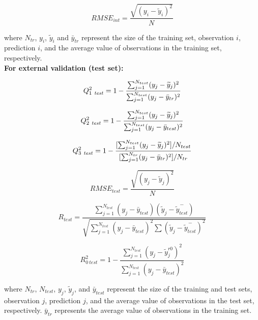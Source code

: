 \documentclass{bmcart}
\begin{document}
\begin{equation}
RMSE_{int} = \frac {\sqrt {(y_i - \widetilde{y}_i)^{2}}} {N}
\end{equation}

where $N_{tr}$, $y_i$, $\widetilde{y}_i$ and $\bar{y}_{tr}$ represent the size of the training set, observation $i$, prediction $i$, and the average value of observations in the training set, respectively. \\

{\bf For external validation (test set):}

\begin{equation}
Q_{1\ {\it test}}^{2} = 1 - \frac {\sum_{j=1}^{N_{test}} (y_j-\widetilde{y}_j)^{2}}  {\sum_{j=1}^{N_{test}} (y_j - \bar{y}_{tr})^{2}}
\end{equation}

\begin{equation}
Q_{2\ {\it test}}^{2} = 1 - \frac {\sum_{j=1}^{N_{test}} (y_j-\widetilde{y}_j)^{2}}  {\sum_{j=1}^{N_{test}} (y_j - \bar{y}_{test})^{2}}
\end{equation}

\begin{equation}
Q_{3\ {\it test}}^{2} = 1 - \frac {[\sum_{j=1}^{N_{test}} (y_j-\widetilde{y}_j)^{2}] / N_{test} }  {[ \sum_{j=1}^{N_{tr}} (y_j - \bar{y}_{tr})^{2}] / N_{tr}}
\end{equation}

\begin{equation}
RMSE_{test} = \frac {\sqrt {(y_j - \widetilde{y}_j)^{2}}} {N} 
\end{equation}

\begin{equation}
R_{test} = \frac {{\sum_{j=1}^{N_{test}} (y_{j} - \bar{y}_{test})}  (\widetilde{y}_{j} - \overset{-}{\widetilde{y}_{test}})} 
{\sqrt{\sum_{j=1}^{N_{test}} (y_{j} - \bar{y}_{test})^{2} \sum{ (\widetilde{y}_{j} - \overset{-}{\widetilde{y}_{test}})^{2}}}}
\end{equation}

\begin{equation}
R_{0\ test}^2 = 1 - \frac {\sum_{j=1}^{N_{test}} (y_{j} - \widetilde{y}_{j}^{ r0})^{2}} {\sum_{j=1}^{N_{test}} (y_{j} - \bar{y}_{test})^{2}} 
\end{equation}

where $N_{tr}$, $N_{test}$, $y_j$, $\widetilde{y}_j$, and $\bar{y}_{test}$ represent the size of the training and test sets, observation $j$, prediction $j$, and the average value of observations in the test set, respectively.
$\bar{y}_{tr}$ represents the average value of observations in the training set.\\
\end{document}
